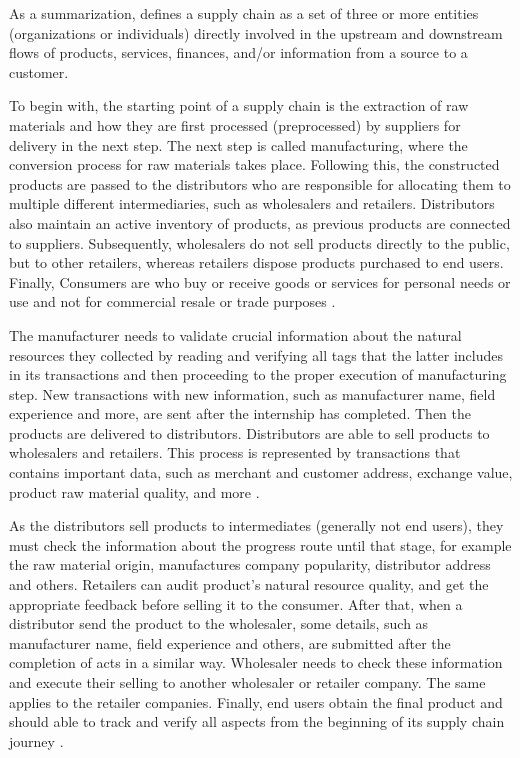 As a summarization, \cite{mentzer2001defining} defines a supply chain as a set of three or more entities (organizations or individuals) directly involved in the upstream and downstream flows of products, services, finances, and/or information from a source to a customer. 


To begin with, the starting point of a supply chain is the extraction of raw materials and how they are first processed (preprocessed) by suppliers for delivery in the next step. The next step is called manufacturing, where the conversion process for raw materials takes place. Following this, the constructed products are passed to the distributors who are responsible for allocating them to multiple different intermediaries, such as wholesalers and retailers. Distributors also maintain an active inventory of products, as previous products are connected to suppliers. Subsequently, wholesalers do not sell products directly to the public, but to other retailers, whereas retailers dispose products purchased to end users. Finally, Consumers are who buy or receive goods or services for personal needs or use and not for commercial resale or trade purposes \cite{litke2019blockchains}.

The manufacturer needs to validate crucial information about the natural resources they collected by reading and verifying all tags that the latter includes in its transactions and then proceeding to the proper execution of manufacturing step. New transactions with new information, such as manufacturer name, field experience and more, are sent after the internship has completed. Then the products are delivered to distributors. Distributors are able to sell products to wholesalers and retailers. This process is represented by transactions that contains important data, such as merchant and customer address, exchange value, product raw material quality, and more \cite{sauer2018extending}. 

As the distributors sell products to intermediates (generally not end users), they must check the information about the progress route until that stage, for example the raw material origin, manufactures company popularity, distributor address and others. Retailers can audit product's natural resource quality, and get the appropriate feedback before selling it to the consumer. After that, when a distributor send the product to the wholesaler, some details, such as manufacturer name, field experience and others, are submitted after the completion of acts in a similar way. Wholesaler needs to check these information and execute their selling to another wholesaler or retailer company. The same applies to the retailer companies. Finally, end users obtain the final product and should able to track and verify all aspects from the beginning of its supply chain journey \cite{litke2019blockchains}. 